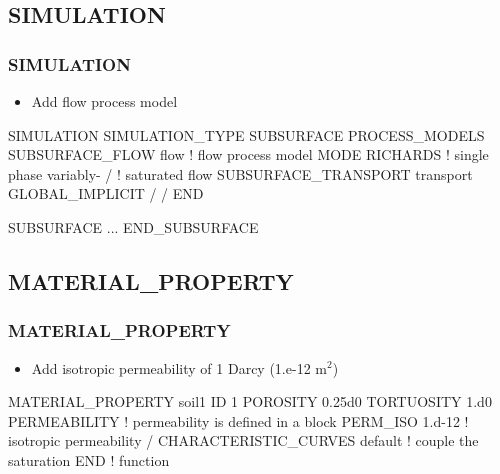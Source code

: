 \documentclass{beamer}
\newcommand\bluecomment[1]{{{\color{blue} #1}}}
\newcommand\magentacomment[1]{{{\color{magenta} #1}}}
\begin{document}
\subsection{SIMULATION}

\begin{frame}[fragile]\frametitle{SIMULATION}

\begin{itemize}
  \item Add flow process model
\end{itemize}


\begin{semiverbatim}
SIMULATION
  SIMULATION_TYPE SUBSURFACE
  PROCESS_MODELS
    \magentacomment{SUBSURFACE_FLOW flow}  \bluecomment{! flow process model}
      \magentacomment{MODE RICHARDS}       \bluecomment{! single phase variably-}
    \magentacomment{/}                     \bluecomment{!   saturated flow}
    SUBSURFACE_TRANSPORT transport
      GLOBAL_IMPLICIT
    /
  /
END

SUBSURFACE
  ...
END_SUBSURFACE
\end{semiverbatim}

\end{frame}

\subsection{MATERIAL\_PROPERTY}

\begin{frame}[fragile]\frametitle{MATERIAL\_PROPERTY}

\begin{itemize}
\item Add isotropic permeability of 1 Darcy (1.e-12 m$^2$)
\end{itemize}

\begin{semiverbatim}
MATERIAL_PROPERTY soil1
  ID 1
  POROSITY 0.25d0
  TORTUOSITY 1.d0
  \magentacomment{PERMEABILITY}     \bluecomment{! permeability is defined in a block}
    \magentacomment{PERM_ISO 1.d-12}  \bluecomment{! isotropic permeability}
  \magentacomment{/}
  \magentacomment{CHARACTERISTIC_CURVES default}  \bluecomment{! couple the saturation}
END                              \bluecomment{!   function}
\end{semiverbatim}

\end{frame}
\end{document}
